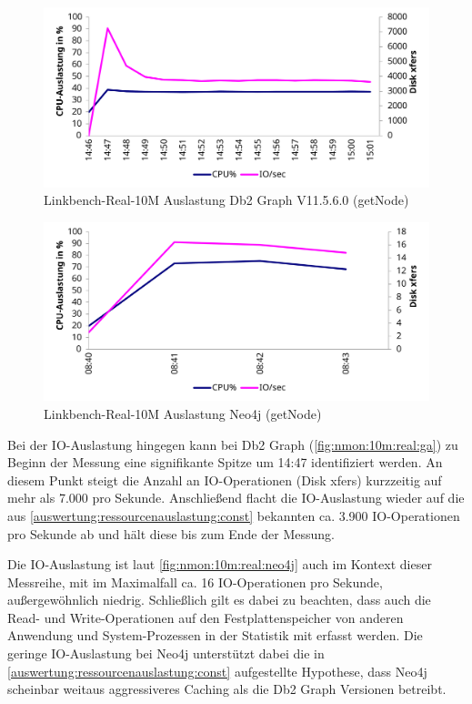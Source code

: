 \begin{figure}[!ht]
    \centering
    \includegraphics[width=\textwidth]{images/stats/linkbench-10m-real_ga.pdf}
    \caption{Linkbench-Real-10M Auslastung Db2 Graph V11.5.6.0 (getNode)}
    \label{fig:nmon:10m:real:ga}
\end{figure}

\begin{figure}[!ht]
    \centering
    \includegraphics[width=\textwidth]{images/stats/linkbench-10m-real_neo4j.pdf}
    \caption{Linkbench-Real-10M Auslastung Neo4j (getNode)}
    \label{fig:nmon:10m:real:neo4j}
\end{figure}

Bei der IO-Auslastung hingegen kann bei Db2 Graph (\autoref{fig:nmon:10m:real:ga}) zu Beginn der Messung eine signifikante Spitze um 14:47 identifiziert werden. An diesem Punkt steigt die Anzahl an IO-Operationen (Disk xfers) kurzzeitig auf mehr als 7.000 pro Sekunde. Anschließend flacht die IO-Auslastung wieder auf die aus \autoref{auswertung:ressourcenauslastung:const} bekannten ca. 3.900 IO-Operationen pro Sekunde ab und hält diese bis zum Ende der Messung.

Die IO-Auslastung ist laut \autoref{fig:nmon:10m:real:neo4j} auch im Kontext dieser Messreihe, mit im Maximalfall ca. 16 IO-Operationen pro Sekunde, außergewöhnlich niedrig. Schließlich gilt es dabei zu beachten, dass auch die Read- und Write-Operationen auf den Festplattenspeicher von anderen Anwendung und System-Prozessen in der Statistik mit erfasst werden. Die geringe IO-Auslastung bei Neo4j unterstützt dabei die in \autoref{auswertung:ressourcenauslastung:const} aufgestellte Hypothese, dass Neo4j scheinbar weitaus aggressiveres Caching als die Db2 Graph Versionen betreibt.

